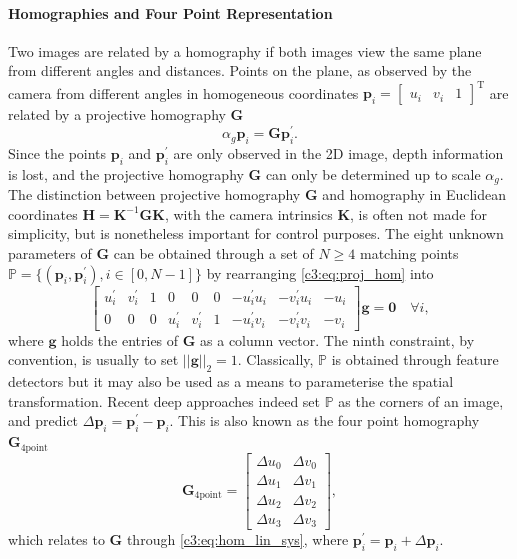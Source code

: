 \paragraph{Homographies and Four Point Representation} Two images are related by a homography if both images view the same plane from different angles and distances. Points on the plane, as observed by the camera from different angles in homogeneous coordinates $\mathbf{p}_i = \begin{bmatrix}u_i&v_i&1\end{bmatrix}^\text{T}$ are related by a projective homography $\mathbf{G}$~\cite{malis2007deeper}
\begin{equation}
    \alpha_g\mathbf{p}_i = \mathbf{G}\mathbf{p}_i^\prime.
    \label{c3:eq:proj_hom}
\end{equation}
Since the points $\mathbf{p}_i$ and $\mathbf{p}_i^\prime$ are only observed in the 2D image, depth information is lost, and the projective homography $\mathbf{G}$ can only be determined up to scale $\alpha_g$. The distinction between projective homography $\mathbf{G}$ and homography in Euclidean coordinates $\mathbf{H} = \mathbf{K}^{-1}\mathbf{G}\mathbf{K}$, with the camera intrinsics $\mathbf{K}$, is often not made for simplicity, but is nonetheless important for control purposes. The eight unknown parameters of $\mathbf{G}$ can be obtained through a set of $N\geq4$ matching points $\mathbb{P} = \{(\mathbf{p}_i, \mathbf{p}^\prime_i), i\in[0,N-1]\}$ by rearranging \eqref{c3:eq:proj_hom} into
\begin{equation}
    \begin{bmatrix}
        u^\prime_i & v^\prime_i & 1 & 0   &   0 & 0 & -u^\prime_i u_i & -v^\prime_i u_i & -u_i \\
        0   &   0 & 0 & u^\prime_i & v^\prime_i & 1 & -u^\prime_i v_i & -v^\prime_i v_i & - v_i
    \end{bmatrix}\mathbf{g}= \mathbf{0}\quad\forall i,
    \label{c3:eq:hom_lin_sys}
\end{equation}
where $\mathbf{g}$ holds the entries of $\mathbf{G}$ as a column vector. The ninth constraint, by convention, is usually to set $||\mathbf{g}||_2 = 1$. Classically, $\mathbb{P}$ is obtained through feature detectors but it may also be used as a means to parameterise the spatial transformation.
Recent deep approaches indeed set $\mathbb{P}$ as the corners of an image, and predict $\Delta \mathbf{p}_i = \mathbf{p}^\prime_i - \mathbf{p}_i$. This is also known as the four point homography $\mathbf{G}_{4\text{point}}$
\begin{equation}
    \mathbf{G}_{4\text{point}} = \begin{bmatrix}
        \Delta u_0 & \Delta v_0 \\
        \Delta u_1 & \Delta v_1 \\
        \Delta u_2 & \Delta v_2 \\
        \Delta u_3 & \Delta v_3
    \end{bmatrix},
    \label{c3:eq:4pt}
\end{equation}
which relates to $\mathbf{G}$ through \eqref{c3:eq:hom_lin_sys}, where $\mathbf{p}^\prime_i = \mathbf{p}_i + \Delta \mathbf{p}_i$.    

